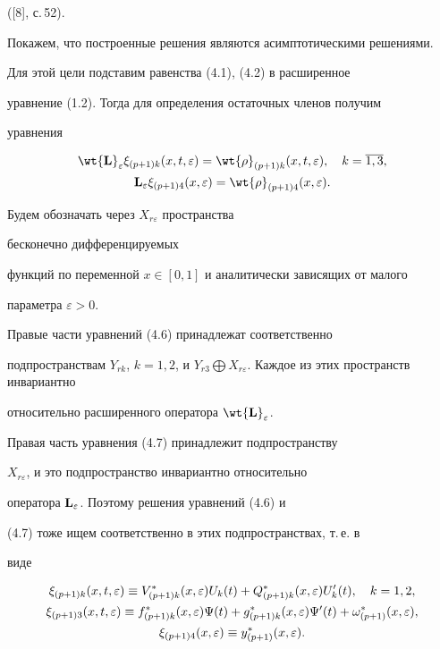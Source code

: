 ([8], с.\,52).





Покажем, что построенные решения являются асимптотическими решениями.


Для этой цели подставим равенства (4.1), (4.2) в расширенное


уравнение (1.2). Тогда для определения остаточных членов получим


уравнения


\begin{gather}


\wt{\bold L}_{\e} \xi_{(p+1)k} (x,t, \e) =


{\wt{\rho}}_{(p+1)k} (x,t, \e), \quad k = \overline{1,3}, \\


\bold{{L}}_{\e} \xi_{(p+1)4} (x, \e) =


{\wt{\rho}}_{(p+1)4} (x, \e).


\end{gather}





Будем обозначать через $X_{r \varepsilon}$ пространства


бесконечно дифференцируемых


функций по переменной $x \in [0,1]$ и аналитически зависящих от малого


параметра $\varepsilon > 0$.


Правые части уравнений (4.6) принадлежат соответственно


подпространствам $Y_{rk}$, $k = 1,2$, и $Y_{r3} \bigoplus


X_{r \varepsilon}$. Каждое из этих пространств инвариантно


относительно расширенного оператора $\wt{\bold L}_{\e}$.


Правая часть уравнения (4.7) принадлежит подпространству


$X_{r \varepsilon}$, и это подпространство инвариантно относительно


оператора $\bold{L}_{\varepsilon}$. Поэтому решения уравнений (4.6) и


(4.7) тоже ищем соответственно в этих подпространствах, т.\,е. в


виде


\begin{gather}


\xi_{(p+1)k} (x,t, \e) \equiv V_{(p+1)k} ^* (x, \e) U_k


(t) + Q_{(p+1)k} ^* (x, \e) U_k '(t),\quad k = 1,2, \\


\xi_{(p+1)3} (x,t, \e) \equiv f_{(p+1)k} ^* (x, \e) \Psi


(t) + g_{(p+1)k} ^* (x, \e) \Psi '(t) + \omega_{(p+1) } ^* (x, \e ), \\


\xi_{(p+1)4} (x, \e) \equiv y_{(p+1) } ^* (x, \e ).


\end{gather}


